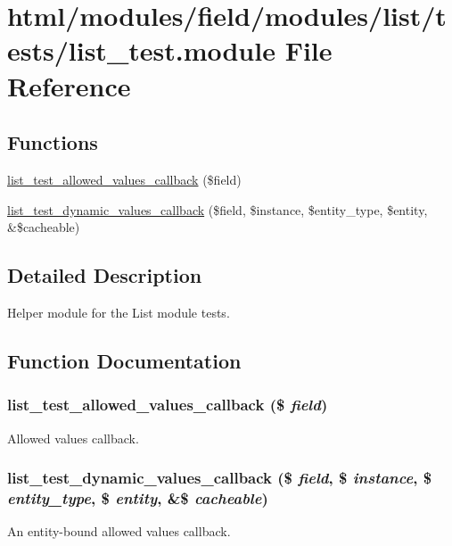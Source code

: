 \hypertarget{list__test_8module}{
\section{html/modules/field/modules/list/tests/list\_\-test.module File Reference}
\label{list__test_8module}
}
\subsection*{Functions}
\begin{DoxyCompactItemize}
\item 
\hyperlink{list__test_8module_a732a8d1450e605534f9f6594443f3c45}{list\_\-test\_\-allowed\_\-values\_\-callback} (\$field)
\item 
\hyperlink{list__test_8module_adf59dfdf0e6093d782729e81ef6279c6}{list\_\-test\_\-dynamic\_\-values\_\-callback} (\$field, \$instance, \$entity\_\-type, \$entity, \&\$cacheable)
\end{DoxyCompactItemize}


\subsection{Detailed Description}
Helper module for the List module tests. 

\subsection{Function Documentation}
\hypertarget{list__test_8module_a732a8d1450e605534f9f6594443f3c45}{
\subsubsection[{list\_\-test\_\-allowed\_\-values\_\-callback}]{\setlength{\rightskip}{0pt plus 5cm}list\_\-test\_\-allowed\_\-values\_\-callback (\$ {\em field})}}
\label{list__test_8module_a732a8d1450e605534f9f6594443f3c45}
Allowed values callback. \hypertarget{list__test_8module_adf59dfdf0e6093d782729e81ef6279c6}{
\subsubsection[{list\_\-test\_\-dynamic\_\-values\_\-callback}]{\setlength{\rightskip}{0pt plus 5cm}list\_\-test\_\-dynamic\_\-values\_\-callback (\$ {\em field}, \/  \$ {\em instance}, \/  \$ {\em entity\_\-type}, \/  \$ {\em entity}, \/  \&\$ {\em cacheable})}}
\label{list__test_8module_adf59dfdf0e6093d782729e81ef6279c6}
An entity-\/bound allowed values callback. 